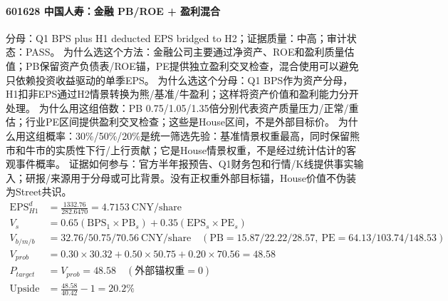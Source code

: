 \paragraph{601628 中国人寿：金融 PB/ROE + 盈利混合}
分母：Q1 BPS plus H1 deducted EPS bridged to H2；证据质量：中高；审计状态：PASS。
为什么选这个方法：金融公司主要通过净资产、ROE和盈利质量估值；PB保留资产负债表/ROE锚，PE提供独立盈利交叉检查，混合使用可以避免只依赖投资收益驱动的单季EPS。
为什么选这个分母：Q1 BPS作为资产分母，H1扣非EPS通过H2情景转换为熊/基准/牛盈利；这样将资产价值和盈利能力分开处理。
为什么用这组倍数：PB 0.75/1.05/1.35倍分别代表资产质量压力/正常/重估；行业PE区间提供盈利交叉检查；这些是House区间，不是外部目标价。
为什么用这组概率：30\%/50\%/20\%是统一筛选先验：基准情景权重最高，同时保留熊市和牛市的实质性下行/上行贡献；它是House情景权重，不是经过统计估计的客观事件概率。
证据如何参与：官方半年报预告、Q1财务包和行情/K线提供事实输入；研报/来源用于分母或可比背景。没有正权重外部目标锚，House价值不伪装为Street共识。
\begin{align*}
\mathrm{EPS}_{H1}^d &= \frac{1332.76}{282.6470} = 4.7153\ \mathrm{CNY/share}\\
V_s &= 0.65\left(\mathrm{BPS}_1\times \mathrm{PB}_s\right)+0.35\left(\mathrm{EPS}_s\times \mathrm{PE}_s\right)\\
V_{b/m/b} &= 32.76/50.75/70.56\ \mathrm{CNY/share}\quad(\mathrm{PB}=15.87/22.22/28.57,\ \mathrm{PE}=64.13/103.74/148.53)\\
V_{prob} &= 0.30\times 30.32+0.50\times 50.75+0.20\times 70.56=48.58\\
P_{target} &= V_{prob}=48.58\quad(\text{外部锚权重}=0)\\
\mathrm{Upside} &= \frac{48.58}{40.42}-1=20.2\%\\
\end{align*}

